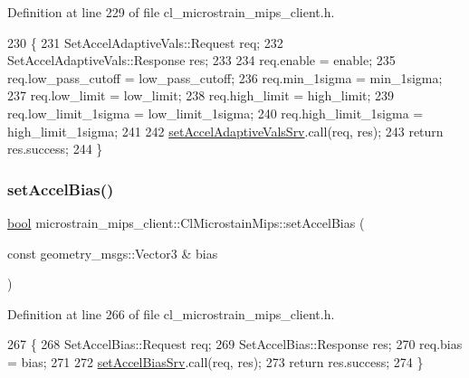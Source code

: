 Definition at line 229 of file cl\+\_\+microstrain\+\_\+mips\+\_\+client.\+h.


\begin{DoxyCode}
230     \{
231         SetAccelAdaptiveVals::Request req;
232         SetAccelAdaptiveVals::Response res;
233 
234         req.enable = enable;
235         req.low\_pass\_cutoff = low\_pass\_cutoff;
236         req.min\_1sigma = min\_1sigma;
237         req.low\_limit = low\_limit;
238         req.high\_limit = high\_limit;
239         req.low\_limit\_1sigma = low\_limit\_1sigma;
240         req.high\_limit\_1sigma = high\_limit\_1sigma;
241 
242         \hyperlink{classmicrostrain__mips__client_1_1ClMicrostainMips_a90afc14b3439c0951ceeb13a7a0e7854}{setAccelAdaptiveValsSrv}.call(req, res);
243         \textcolor{keywordflow}{return} res.success;
244     \}
\end{DoxyCode}
\mbox{\label{classmicrostrain__mips__client_1_1ClMicrostainMips_a8864e13bc5b385794642e49764cbfe8c}} 
\subsubsection{\texorpdfstring{set\+Accel\+Bias()}{setAccelBias()}}
{\footnotesize\ttfamily \hyperlink{classbool}{bool} microstrain\+\_\+mips\+\_\+client\+::\+Cl\+Microstain\+Mips\+::set\+Accel\+Bias (\begin{DoxyParamCaption}\item[{const geometry\+\_\+msgs\+::\+Vector3 \&}]{bias }\end{DoxyParamCaption})\hspace{0.3cm}{\ttfamily [inline]}}



Definition at line 266 of file cl\+\_\+microstrain\+\_\+mips\+\_\+client.\+h.


\begin{DoxyCode}
267     \{
268         SetAccelBias::Request req;
269         SetAccelBias::Response res;
270         req.bias = bias;
271 
272         \hyperlink{classmicrostrain__mips__client_1_1ClMicrostainMips_a95389f5732d4d8c26422c74b169b4c96}{setAccelBiasSrv}.call(req, res);
273         \textcolor{keywordflow}{return} res.success;
274     \}
\end{DoxyCode}
\mbox{\label{classmicrostrain__mips__client_1_1ClMicrostainMips_a09d57c6812308c11a7e99f9d75635f51}} 
